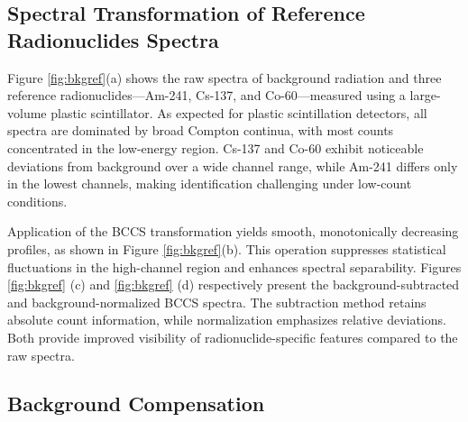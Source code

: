 \documentclass[10pt]{wlscirep}
\begin{document}
\subsection*{Spectral Transformation of Reference Radionuclides Spectra}

Figure \ref{fig:bkgref}(a) shows the raw spectra of background radiation and three reference radionuclides—Am-241, Cs-137, and Co-60—measured using a large-volume plastic scintillator. As expected for plastic scintillation detectors, all spectra are dominated by broad Compton continua, with most counts concentrated in the low-energy region. Cs-137 and Co-60 exhibit noticeable deviations from background over a wide channel range, while Am-241 differs only in the lowest channels, making identification challenging under low-count conditions.

Application of the BCCS transformation yields smooth, monotonically decreasing profiles, as shown in Figure \ref{fig:bkgref}(b). This operation suppresses statistical fluctuations in the high-channel region and enhances spectral separability. Figures \ref{fig:bkgref} (c) and \ref{fig:bkgref} (d) respectively present the background-subtracted and background-normalized BCCS spectra. The subtraction method retains absolute count information, while normalization emphasizes relative deviations. Both provide improved visibility of radionuclide-specific features compared to the raw spectra.


\subsection*{Background Compensation }



\end{document}

